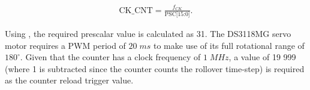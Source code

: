 \begin{align}
	\text{CK\_CNT}=\frac{f_{CK}}{\text{PSC[15:0]}}.
	\label{pwm-counter-clock}
\end{align}

Using , the required prescalar value is calculated as 31. The DS3118MG servo motor requires a PWM period of $20\;ms$ to make use of its full rotational range of $180^{\circ}$. Given that the counter has a clock frequency of $1\;MHz$, a value of 19 999 (where 1 is subtracted since the counter counts the rollover time-step) is required as the counter reload trigger value.

\pendsign


